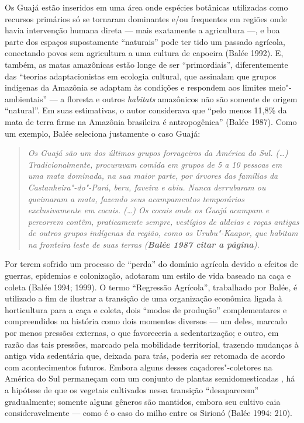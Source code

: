 Os Guajá estão inseridos em uma área onde espécies botânicas utilizadas
como recursos primários só se tornaram dominantes e/ou frequentes em
regiões onde havia intervenção humana direta --- mais exatamente a
agricultura ---, e boa parte dos espaços supostamente ``naturais'' pode
ter tido um passado agrícola, conectando povos sem agricultura a uma
cultura de capoeira (Balée 1992). E, também, as matas amazônicas estão
longe de ser ``primordiais'', diferentemente das ``teorias
adaptacionistas em ecologia cultural, que assinalam que grupos indígenas
da Amazônia se adaptam às condições e respondem aos limites
meio"-ambientais'' --- a floresta e outros \emph{habitats} amazônicos não
são somente de origem ``natural''. Em suas estimativas, o autor
considerava que ``pelo menos 11,8\% da mata de terra firme na Amazônia
brasileira é antropogênica'' (Balée 1987). Como um exemplo, Balée
seleciona justamente o caso Guajá:

\begin{quote}
\emph{Os Guajá são um dos últimos grupos forrageiros da América do Sul.
(\ldots{}) Tradicionalmente, procuravam comida em grupos de 5 a 10
pessoas em uma mata dominada, na sua maior parte, por árvores das
famílias da Castanheira"-do"-Pará, beru, faveira e abiu. Nunca derrubaram
ou queimaram a mata, fazendo seus acampamentos temporários
exclusivamente em cocais. (\ldots{}) Os cocais onde os Guajá acampam e
percorrem contêm, praticamente sempre, vestígios de aldeias e roças
antigas de outros grupos indígenas da região, como os Urubu"-Kaapor, que
habitam na fronteira leste de suas terras (\textbf{Balée 1987 citar a
página}).}
\end{quote}

Por terem sofrido um processo de ``perda'' do domínio agrícola devido a
efeitos de guerras, epidemias e colonização, adotaram um estilo de vida
baseado na caça e coleta (Balée 1994; 1999). O termo ``Regressão
Agrícola'', trabalhado por Balée, é utilizado a fim de ilustrar a
transição de uma organização econômica ligada à horticultura para a caça
e coleta, dois ``modos de produção'' complementares e compreendidos na
história como dois momentos diversos --- um deles, marcado por menos
pressões externas, o que favoreceria a sedentarização; e outro, em razão
das tais pressões, marcado pela mobilidade territorial, trazendo
mudanças à antiga vida sedentária que, deixada para trás, poderia ser
retomada de acordo com acontecimentos futuros. Embora alguns desses
caçadores"-coletores na América do Sul permaneçam com um conjunto de
plantas semidomesticadas , há a hipótese de que os vegetais cultivados
nessa transição ``desaparecem'' gradualmente; somente alguns gêneros são
mantidos, embora seu cultivo caia consideravelmente --- como é o caso do
milho entre os Sirionó (Balée 1994: 210).

